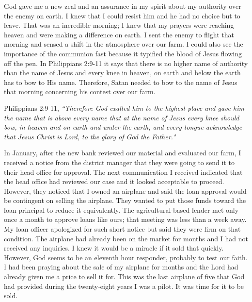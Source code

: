 \documentclass[oneside,12pt]{book}
\begin{document}
God gave me a new zeal and an assurance in my spirit about my authority over the enemy on earth. I knew that I could resist him and he had no choice but to leave. That was an incredible morning; I knew that my prayers were reaching heaven and were making a difference on earth. I sent the enemy to flight that morning and sensed a shift in the atmosphere over our farm. I could also see the importance of the communion fast because it typified the blood of Jesus flowing off the pen. In Philippians 2:9-11 it says that there is no higher name of authority than the name of Jesus and every knee in heaven, on earth and below the earth has to bow to His name. Therefore, Satan needed to bow to the name of Jesus that morning concerning his contest over our farm. 

Philippians 2:9-11, \textit{``Therefore God exalted him to the highest place and gave him the name that is above every name that at the name of Jesus every knee should bow, in heaven and on earth and under the earth, and every tongue acknowledge that Jesus Christ is Lord, to the glory of God the Father."}

In January, after the new bank reviewed our material and evaluated our farm, I received a notice from the district manager that they were going to send it to their head office for approval. The next communication I received indicated that the head office had reviewed our case and it looked acceptable to proceed. However, they noticed that I owned an airplane and said the loan approval would be contingent on selling the airplane. They wanted to put those funds toward the loan principal to reduce it equivalently. The agricultural-based lender met only once a month to approve loans like ours; that meeting was less than a week away. My loan officer apologized for such short notice but said they were firm on that condition. The airplane had already been on the market for months and I had not received any inquiries. I knew it would be a miracle if it sold that quickly. However, God seems to be an eleventh hour responder, probably to test our faith. I had been praying about the sale of my airplane for months and the Lord had already given me a price to sell it for. This was the last airplane of five that God had provided during the twenty-eight years I was a pilot. It was time for it to be sold.
\end{document}
